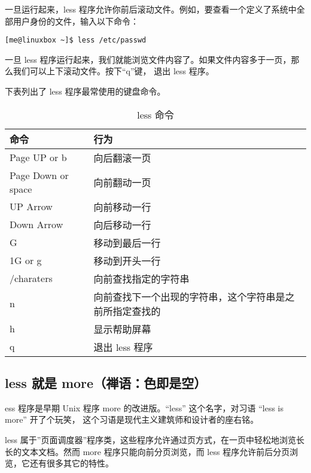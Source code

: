\par 一旦运行起来，less 程序允许你前后滚动文件。例如，要查看一个定义了系统中全部用户身份的文件，输入以下命令：
\begin{lstlisting}
[me@linuxbox ~]$ less /etc/passwd
\end{lstlisting}

\par 一旦 less 程序运行起来，我们就能浏览文件内容了。如果文件内容多于一页，那么我们可以上下滚动文件。按下“q”键， 退出 less 程序。

\par 下表列出了 less 程序最常使用的键盘命令。
\begin{table}[ht!]
\caption{less 命令}
\label{table3}
\centering
\begin{tabular}{p{4cm}p{11cm}}
\hline
命令 & 行为\\

\hline
Page UP or b &	向后翻滚一页\\
Page Down or space & 向前翻动一页 \\
UP Arrow & 向前移动一行\\
Down Arrow &	向后移动一行\\
G	& 移动到最后一行\\
1G or g	& 移动到开头一行\\
/charaters	& 向前查找指定的字符串\\
n	& 向前查找下一个出现的字符串，这个字符串是之前所指定查找的\\
h	& 显示帮助屏幕\\
q	& 退出 less 程序\\
\hline
\end{tabular}
\end{table}

\fboxrule=6pt \fboxsep=4pt
\begin{colorboxed}[boxcolor=lightgray,bgcolor=white]
\subsection{less 就是 more（禅语：色即是空）}

ess 程序是早期 Unix 程序 more 的改进版。“less” 这个名字，对习语 “less is more” 开了个玩笑， 这个习语是现代主义建筑师和设计者的座右铭。

\par less 属于”页面调度器”程序类，这些程序允许通过页方式，在一页中轻松地浏览长长的文本文档。然而 more 程序只能向前分页浏览，而 less 程序允许前后分页浏览，它还有很多其它的特性。
\end{colorboxed}


